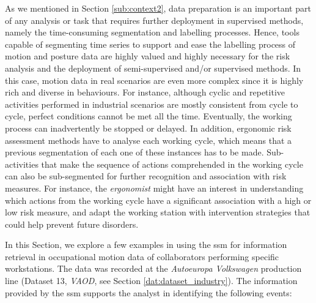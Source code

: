 As we mentioned in Section \ref{sub:context2}, data preparation is an important part of any analysis or task that requires further deployment in supervised methods, namely the time-consuming segmentation and labelling processes. Hence, tools capable of segmenting time series to support and ease the labelling process of motion and posture data are highly valued and highly necessary for the risk analysis and the deployment of semi-supervised and/or supervised methods. In this case, motion data in real scenarios are even more complex since it is highly rich and diverse in behaviours. For instance, although cyclic and repetitive activities performed in industrial scenarios are mostly consistent from cycle to cycle, perfect conditions cannot be met all the time. Eventually, the working process can inadvertently be stopped or delayed. In addition, ergonomic risk assessment methods have to analyse each working cycle, which means that a previous segmentation of each one of these instances has to be made. Sub-activities that make the sequence of actions comprehended in the working cycle can also be sub-segmented for further recognition and association with risk measures. For instance, the \textit{ergonomist} might have an interest in understanding which actions from the working cycle have a significant association with a high or low risk measure, and adapt the working station with intervention strategies that could help prevent future disorders. 

In this Section, we explore a few examples in using the \gls{ssm} for information retrieval in occupational motion data of collaborators performing specific workstations. The data was recorded at the \textit{Autoeuropa Volkswagen} production line (Dataset 13, \textit{VAOD}, see Section \ref{dat:dataset_industry}). The information provided by the \gls{ssm} supports the analyst in identifying the following events: 

